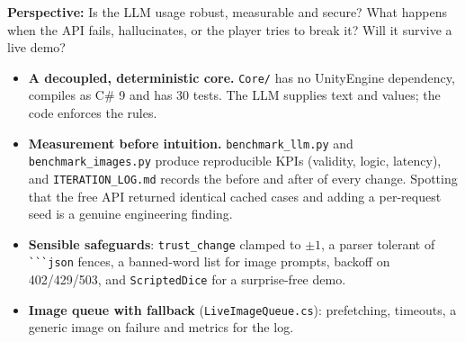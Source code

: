 \documentclass[11pt,a4paper]{article}
\newcommand{\file}[1]{\texttt{\small #1}}
\begin{document}
\begin{perfil}
\textbf{Perspective:} Is the LLM usage robust, measurable and secure? What happens when the API
fails, hallucinates, or the player tries to break it? Will it survive a live demo?
\end{perfil}

\begin{fuerte}
\begin{itemize}
\item \textbf{A decoupled, deterministic core.} \file{Core/} has no UnityEngine dependency, compiles
as C\# 9 and has 30 tests. The LLM supplies text and values; the code enforces the rules.
\item \textbf{Measurement before intuition.} \file{benchmark\_llm.py} and
\file{benchmark\_images.py} produce reproducible KPIs (validity, logic, latency), and
\file{ITERATION\_LOG.md} records the before and after of every change. Spotting that the free API
returned identical cached cases and adding a per-request seed is a genuine engineering finding.
\item \textbf{Sensible safeguards}: \texttt{trust\_change} clamped to $\pm1$, a parser tolerant of
\texttt{\`{}\`{}\`{}json} fences, a banned-word list for image prompts, backoff on
402/429/503, and \texttt{ScriptedDice} for a surprise-free demo.
\item \textbf{Image queue with fallback} (\file{LiveImageQueue.cs}): prefetching, timeouts, a generic
image on failure and metrics for the log.
\end{itemize}
\end{fuerte}
\end{document}
